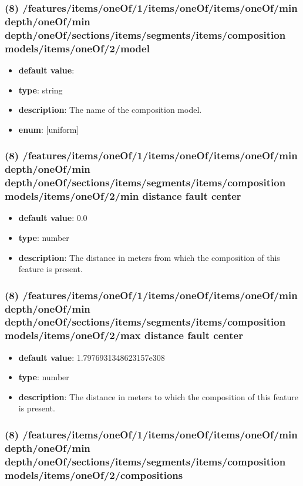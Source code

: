 \subsubsection{(8) /features/items/oneOf/1/items/oneOf/items/oneOf/min depth/oneOf/min depth/oneOf/sections/items/segments/items/composition models/items/oneOf/2/model}
\begin{itemize}[leftmargin=8em]\item {\bf default value}: 
\item {\bf type}: string
\item {\bf description}: The name of the composition model.
\item {\bf enum}: [uniform]\end{itemize}\subsubsection{(8) /features/items/oneOf/1/items/oneOf/items/oneOf/min depth/oneOf/min depth/oneOf/sections/items/segments/items/composition models/items/oneOf/2/min distance fault center}
\begin{itemize}[leftmargin=8em]\item {\bf default value}: 0.0
\item {\bf type}: number
\item {\bf description}: The distance in meters from which the composition of this feature is present.
\end{itemize}\subsubsection{(8) /features/items/oneOf/1/items/oneOf/items/oneOf/min depth/oneOf/min depth/oneOf/sections/items/segments/items/composition models/items/oneOf/2/max distance fault center}
\begin{itemize}[leftmargin=8em]\item {\bf default value}: 1.7976931348623157e308
\item {\bf type}: number
\item {\bf description}: The distance in meters to which the composition of this feature is present.
\end{itemize}\subsubsection{(8) /features/items/oneOf/1/items/oneOf/items/oneOf/min depth/oneOf/min depth/oneOf/sections/items/segments/items/composition models/items/oneOf/2/compositions}
